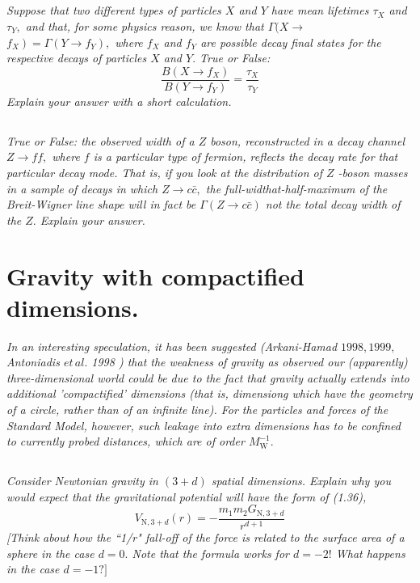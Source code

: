 \documentclass{article}
\begin{document}
\subsection{}
\textit{Suppose that two different types of particles $X$ and $Y$ have mean lifetimes $\tau_{X}$ and $\tau_{Y},$ and that, for some physics reason, we know that $\Gamma(X \rightarrow$ $\left.f_{X}\right)=\Gamma\left(Y \rightarrow f_{Y}\right),$ where $f_{X}$ and $f_{Y}$ are possible decay final states for the respective decays of particles $X$ and $Y .$ True or False:
$$
\frac{B\left(X \rightarrow f_{X}\right)}{B\left(Y \rightarrow f_{Y}\right)}=\frac{\tau_{X}}{\tau_{Y}}
$$
Explain your answer with a short calculation.}


\subsection{}
\textit{True or False: the observed width of a $Z$ boson, reconstructed in a decay channel $Z \rightarrow f f,$ where $f$ is a particular type of fermion, reflects the decay rate for that particular decay mode. That is, if you look at the distribution of $Z$ -boson masses in a sample of decays in which $Z \rightarrow c \bar{c},$ the full-widthat-half-maximum of the Breit-Wigner line shape will in fact be $\Gamma(Z \rightarrow c \bar{c})$ not the total decay width of the $Z .$ Explain your answer.}

\newpage

\section{Gravity with compactified dimensions.}
\textit{In an interesting speculation, it has been suggested (Arkani-Hamad $1998,1999,$ Antoniadis $e t\, al.$ 1998 ) that the weakness of gravity as observed our (apparently) three-dimensional world could be due to the fact that gravity actually extends into additional 'compactified' dimensions (that is, dimensiong which have the geometry of a circle, rather than of an infinite line). For the particles and forces of the Standard Model, however, such leakage into extra dimensions has to be confined to currently probed distances, which are of order $M_{\mathrm{W}}^{-1}.$}


\subsection{}
\textit{Consider Newtonian gravity in $(3+d)$ spatial dimensions. Explain why you would expect that the gravitational potential will have the form of (1.36), 
$$
V_{\mathrm{N}, 3+d}(r)=-\frac{m_{1} m_{2} G_{\mathrm{N}, 3+d}}{r^{d+1}}
$$
[Think about how the ``1/r" fall-off of the force is related to the surface area of a sphere in the case $d=0 .$ Note that the formula works for $d=-2 !$ What happens in the case $d=-1 ?]$}
\end{document}
